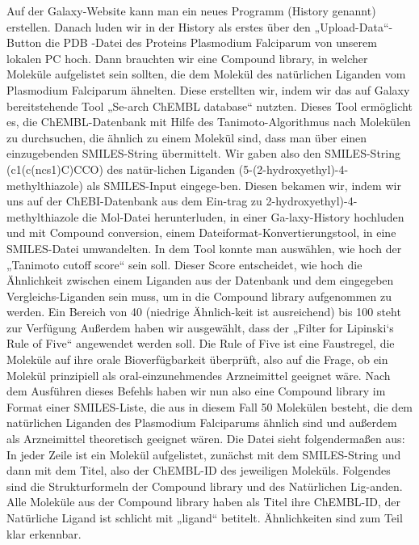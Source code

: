 \documentclass[11pt]{article}
\begin{document}
    Auf der Galaxy-Website kann man ein neues Programm (History genannt) erstellen. Danach luden wir in der History als erstes über den „Upload-Data“-Button die PDB -Datei des Proteins Plasmodium Falciparum von unserem lokalen PC hoch.
    Dann brauchten wir eine Compound library, in welcher Moleküle aufgelistet sein sollten, die dem Molekül des natürlichen Liganden vom Plasmodium Falciparum ähnelten. Diese erstellten wir, indem wir das auf Galaxy bereitstehende Tool „Se-arch ChEMBL database“ nutzten. Dieses Tool ermöglicht es, die ChEMBL-Datenbank mit Hilfe des Tanimoto-Algorithmus nach Molekülen zu durchsuchen, die ähnlich zu einem Molekül sind, dass man über einen einzugebenden SMILES-String übermittelt. Wir gaben also den SMILES-String (c1(c(ncs1)C)CCO) des natür-lichen Liganden (5-(2-hydroxyethyl)-4-methylthiazole) als SMILES-Input eingege-ben. Diesen bekamen wir, indem wir uns auf der ChEBI-Datenbank aus dem Ein-trag zu 2-hydroxyethyl)-4-methylthiazole die Mol-Datei herunterluden, in einer Ga-laxy-History hochluden und mit Compound conversion, einem Dateiformat-Konvertierungstool, in eine SMILES-Datei umwandelten.
    In dem Tool konnte man auswählen, wie hoch der „Tanimoto cutoff score“ sein soll. Dieser Score entscheidet, wie hoch die Ähnlichkeit zwischen einem Liganden aus der Datenbank und dem eingegeben Vergleichs-Liganden sein muss, um in die Compound library aufgenommen zu werden. Ein Bereich von 40 (niedrige Ähnlich-keit ist ausreichend) bis 100 steht zur Verfügung Außerdem haben wir ausgewählt, dass der „Filter for Lipinski‘s Rule of Five“ angewendet werden soll. Die Rule of Five ist eine Faustregel, die Moleküle auf ihre orale Bioverfügbarkeit überprüft, also auf die Frage, ob ein Molekül prinzipiell als oral-einzunehmendes Arzneimittel geeignet wäre.
    Nach dem Ausführen dieses Befehls haben wir nun also eine Compound library im Format einer SMILES-Liste, die aus in diesem Fall 50 Molekülen besteht, die dem natürlichen Liganden des Plasmodium Falciparums ähnlich sind und außerdem als Arzneimittel theoretisch geeignet wären. Die Datei sieht folgendermaßen aus: In jeder Zeile ist ein Molekül aufgelistet, zunächst mit dem SMILES-String und dann mit dem Titel, also der ChEMBL-ID des jeweiligen Moleküls.
    Folgendes sind die Strukturformeln der Compound library und des Natürlichen Lig-anden. Alle Moleküle aus der Compound library haben als Titel ihre ChEMBL-ID, der Natürliche Ligand ist schlicht mit „ligand“ betitelt. Ähnlichkeiten sind zum Teil klar erkennbar.
\end{document}
